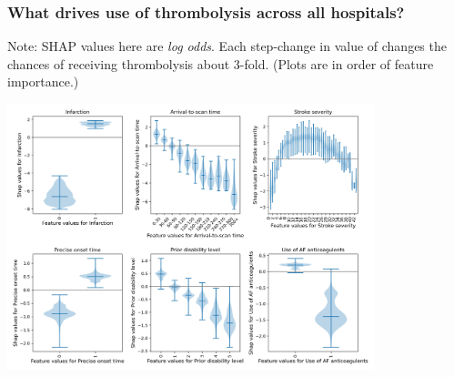 \documentclass{beamer}
\begin{document}

\begin{frame}
\frametitle{What drives use of thrombolysis across all hospitals?}

\footnotesize{Note: SHAP values here are \emph{log odds}. Each step-change in value of  changes the chances of receiving thrombolysis about 3-fold. (Plots are in order of feature importance.)}

\begin{center}
\includegraphics[width=0.80\textwidth]{./images/xgb_thrombolysis_shap_violin.jpg}
\end{center}
\end{frame}

\end{document}

